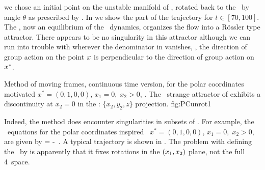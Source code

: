 {\begin{example}
we chose an initial point on the unstable manifold
of , rotated back to the \slice\ by angle $\theta$ as
prescribed by . In  we
show the part of the trajectory for $t\in\left[70,100\right]$.
The \reqv, now an equilibrium of the
\reducedsp\ dynamics, organizes the flow into a R\"ossler type
attractor. There appears to be no singularity in this
attractor although we can run into trouble with
 wherever the denominator in
 vanishes, \ie, the direction of group
action on the point $x$ is perpendicular to the direction
of group action on $x^*$.

{}{
Method of moving frames, continuous time version, for the
polar coordinates motivated $x^{*}=(0,1,0,0)$,
$x_1=0,\;x_2>0$, \slice. The \CLf\ strange attractor of
 exhibits a discontinuity at
$x_2=0$ in the \reducedsp:
$\{x_2,y_2,z\}$ projection.
}
{fig:PCunrot1}

Indeed, the method does encounter singularities in
subsets of \statesp.
For example, the \reducedsp\ equations 
for the polar coordinates inspired \slice\
$x^{*}=(0,1,0,0)$, $x_1=0,\;x_2>0$,
are given by
\beq
\dot{\ssp} = \vel -  \Lg \cdot \ssp
\,.
A typical trajectory is shown in .
The problem with defining the \slice\ by
 is apparently that it fixes rotations
in the $(x_1,x_2)$ plane, not the full 4\dmn\ space.
\end{example}

}
